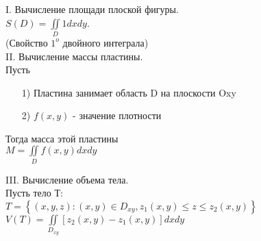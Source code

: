 
I. Вычисление площади плоской фигуры. \\
$S(D) = \iint\limits_{D} 1dxdy$. \\
(Свойство $1^o$ двойного интеграла) \\



II. Вычисление массы пластины. \\
Пусть \\
\begin{enumerate}
	\item[1)] 
	Пластина занимает область D на плоскости Oxy
	
	\item[2)]
	$f(x,y)$ - значение плотности
\end{enumerate}

Тогда масса этой пластины \\
$M = \iint\limits_{D} f(x,y) dxdy$



III. Вычисление объема тела. \\

Пусть тело Т: \\
$T = \left\{ \left(x,y,z\right) : (x,y) \in D_{xy}, z_1(x,y) \leqslant z \leqslant z_2(x,y) \right\}$ \\
$V(T) = \iint\limits_{D_{xy}} \left[ z_2(x,y) - z_1(x,y) \right] dxdy$